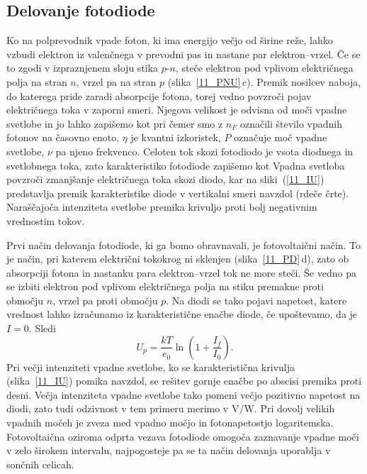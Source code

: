  
\subsection*{Delovanje fotodiode}
Ko na polprevodnik vpade foton, ki ima energijo večjo od širine reže, 
lahko vzbudi elektron iz valenčnega v prevodni pas in nastane par elektron--vrzel. 
Če se to zgodi v izpraznjenem sloju stika $p$-$n$, steče elektron pod vplivom 
električnega polja na stran $n$, vrzel pa na stran $p$ (slika~\ref{11_PNU}\,c). 
Premik nosilcev naboja, do katerega pride zaradi absorpcije fotona, torej vedno
povzroči pojav električnega toka v zaporni smeri. 
Njegova velikost je odvisna od moči vpadne svetlobe in jo lahko zapišemo kot  
pri čemer smo z $n_F$ označili število vpadnih fotonov na časovno enoto, 
$\eta$ je kvantni izkoristek, $P$ označuje moč vpadne svetlobe, $\nu$ pa njeno
frekvenco. Celoten tok skozi fotodiodo je vsota diodnega 
in svetlobnega toka, zato karakteristiko fotodiode zapišemo kot 
Vpadna svetloba povzroči zmanjšanje električnega toka skozi diodo, 
kar na sliki~(\ref{11_IU}) predstavlja premik karakteristike diode v vertikalni 
smeri navzdol (rdeče črte). Naraščajoča intenziteta svetlobe premika krivuljo proti 
bolj negativnim vrednostim tokov. 

Prvi način delovanja fotodiode, ki ga bomo obravnavali, je fotovoltaični način.
To je način, pri katerem električni tokokrog ni sklenjen (slika~\ref{11_PD}\,d), 
zato ob absorpciji fotona in nastanku para elektron--vrzel tok ne more steči. 
Še vedno pa se izbiti elektron pod vplivom električnega polja
na stiku premakne proti območju $n$, vrzel pa proti območju $p$.
Na diodi se tako pojavi napetost, 
katere vrednost lahko izračunamo iz karakteristične enačbe diode, če upoštevamo, da je $I=0$. Sledi
\begin{equation}
U_p = \frac{kT}{e_0}\ln \left(1+ \frac{I_f}{I_0}\right).
\end{equation}
Pri večji intenziteti vpadne svetlobe, ko se karakteristična krivulja (slika~\ref{11_IU}) 
pomika navzdol, se rešitev gornje enačbe po abscisi premika proti desni.
Večja intenziteta vpadne svetlobe tako pomeni večjo 
pozitivno napetost na diodi, zato tudi odzivnost v tem primeru merimo v $\si{\volt}/\si{\watt}$.
Pri dovolj velikih vpadnih močeh je zveza med vpadno močjo in fotonapetostjo
logaritemska. Fotovoltaična oziroma odprta vezava fotodiode omogoča 
zaznavanje vpadne moči v zelo širokem intervalu, najpogosteje pa se ta 
način delovanja uporablja v sončnih celicah. 

